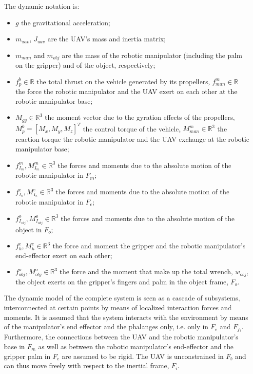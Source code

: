 \documentclass[a4paper, 10pt, conference]{ieeeconf}
\begin{document}
The dynamic notation is:
\begin{itemize}
\item $g$ the gravitational acceleration;
\item $m_\textit{uav}$, $J_\textit{uav}$ are the UAV's mass and
  inertia matrix;
\item $m_\textit{man}$ and $m_\textit{obj}$ are the mass of the robotic manipulator (including the palm on the gripper) and of the object, respectively;
\item $f_{p}^b \in \mathbb{R}$ the total thrust on the vehicle
  generated by its propellers, $f_\textit{man}^m \in \mathbb{R}$ the
  force the robotic manipulator and the UAV exert on each other at the
  robotic manipulator base;
\item $M_\textit{gy} \in \mathbb{R}^3$ the moment vector due to the
  gyration effects of the propellers, $M_p^b = [M_x, M_y, M_z]^T$ the
  control torque of the vehicle, $M_\textit{man}^m \in \mathbb{R}^3$
  the reaction torque the robotic manipulator and the UAV exchange at
  the robotic manipulator base;
\item $f_{I_m}^m, M_{I_m}^m \in \mathbb{R}^3$ the %
  forces and moments due to the absolute motion of the
  robotic manipulator in $F_m$;
\item $f_{I_h}^e, M_{I_h}^e \in \mathbb{R}^3$ the %
  forces and moments due to the absolute motion of the
  robotic manipulator in $F_e$;
\item $f_{I_{\textit{obj}}}^o, M_{I_{\textit{obj}}}^o \in \mathbb{R}^3$ the %
  forces and moments due to the absolute motion of the
  object in $F_o$;
\item $f_h^e, M_h^e \in \mathbb{R}^3$ the force and moment %
  the gripper and the robotic manipulator's end-effector exert on each
  other;
\item $f_\textit{obj}^{o}, M_\textit{obj}^{o} \in \mathbb{R}^3$ the force and the moment %
that make up the total wrench, $w_\textit{obj}$, the object exerts on the gripper's fingers and palm in the object frame, $F_o$.
\end{itemize}

The dynamic model of the complete system is seen as a
cascade of subsystems, interconnected at certain points by means of
localized interaction forces and moments. It is assumed that the
system interacts with the environment by means of the manipulator's end effector
and the phalanges only, i.e. only in $F_e$ and $F_{f_i}$. Furthermore, the
connections between the UAV and the robotic manipulator's base in
$F_m$ as well as between the robotic manipulator's end-effector and
the gripper palm in $F_e$ are assumed to be rigid. The UAV is unconstrained in
$F_b$ and can thus move freely with respect to the
inertial frame, $F_i$.
\end{document}
